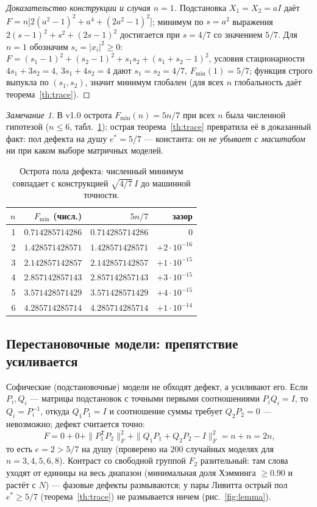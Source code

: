 \documentclass[11pt,a4paper]{article}
\theoremstyle{plain}
\theoremstyle{definition}
\theoremstyle{remark}
\newtheorem{remark}[theorem]{Замечание}
\begin{document}
\begin{proof}[Доказательство конструкции и случая $n=1$]
Подстановка $X_1=X_2=aI$ даёт $F=n\bigl[2(a^2-1)^2+a^4+(2a^2-1)^2\bigr]$;
минимум по $s=a^2$ выражения $2(s-1)^2+s^2+(2s-1)^2$ достигается при
$s=4/7$ со значением $5/7$. Для $n=1$ обозначим $s_i=|x_i|^2\ge0$:
$F=(s_1-1)^2+(s_2-1)^2+s_1s_2+(s_1+s_2-1)^2$, условия стационарности
$4s_1+3s_2=4$, $3s_1+4s_2=4$ дают $s_1=s_2=4/7$, $F_{\min}(1)=5/7$;
функция строго выпукла по $(s_1,s_2)$, значит минимум глобален
(для всех $n$ глобальность даёт теорема~\ref{th:trace}).
\end{proof}

\begin{remark}
В v1.0 острота $F_{\min}(n)=5n/7$ при всех $n$ была численной гипотезой
($n\le6$, табл.~\ref{tab:sharp}); острая теорема~\ref{th:trace} превратила
её в доказанный факт: пол дефекта на душу $e^*=5/7$ --- константа: он
\emph{не убывает с масштабом} ни при каком выборе матричных моделей.
\end{remark}

\begin{table}[htbp]
\centering\small
\begin{tabular}{r r r r}
\toprule
$n$ & $F_{\min}$ (числ.) & $5n/7$ & зазор \\
\midrule
1 & $0.714285714286$ & $0.714285714286$ & $0$ \\
2 & $1.428571428571$ & $1.428571428571$ & $+2\cdot10^{-16}$ \\
3 & $2.142857142857$ & $2.142857142857$ & $+1\cdot10^{-15}$ \\
4 & $2.857142857143$ & $2.857142857143$ & $+3\cdot10^{-15}$ \\
5 & $3.571428571429$ & $3.571428571429$ & $+4\cdot10^{-15}$ \\
6 & $4.285714285714$ & $4.285714285714$ & $+1\cdot10^{-14}$ \\
\bottomrule
\end{tabular}
\caption{Острота пола дефекта: численный минимум совпадает с конструкцией
$\sqrt{4/7}\,I$ до машинной точности.}
\label{tab:sharp}
\end{table}

\subsection{Перестановочные модели: препятствие усиливается}

Софические (подстановочные) модели не обходят дефект, а усиливают его. Если
$P_i,Q_i$ --- матрицы подстановок с точными первыми соотношениями
$P_iQ_i=I$, то $Q_i=P_i^{-1}$, откуда $Q_1P_1=I$ и соотношение суммы требует
$Q_2P_2=0$ --- невозможно; дефект считается точно:
\begin{equation}
  F=0+0+\|P_1^{\mathsf T}P_2\|_F^2+\|Q_1P_1+Q_2P_2-I\|_F^2=n+n=2n,
\end{equation}
то есть $e=2>5/7$ на душу (проверено на $200$ случайных моделях для
$n=3,4,5,6,8$). Контраст со свободной группой $F_2$ разительный: там слова
уходят от единицы на весь диапазон (минимальная доля Хэмминга $\ge0.90$ и
растёт с $N$) --- фазовые дефекты размываются; у пары Ливитта острый пол
$e^*\ge5/7$ (теорема~\ref{th:trace})
не размывается ничем (рис.~\ref{fig:lemma}).
\end{document}
